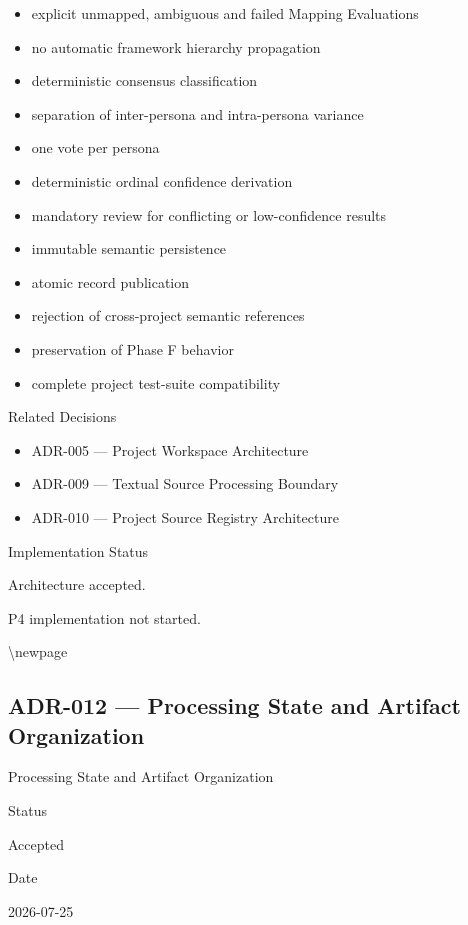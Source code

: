 \begin{itemize}
\item
  explicit unmapped, ambiguous and failed Mapping Evaluations
\item
  no automatic framework hierarchy propagation
\item
  deterministic consensus classification
\item
  separation of inter-persona and intra-persona variance
\item
  one vote per persona
\item
  deterministic ordinal confidence derivation
\item
  mandatory review for conflicting or low-confidence results
\item
  immutable semantic persistence
\item
  atomic record publication
\item
  rejection of cross-project semantic references
\item
  preservation of Phase F behavior
\item
  complete project test-suite compatibility
\end{itemize}

Related Decisions

\begin{itemize}
\tightlist
\item
  ADR-005 --- Project Workspace Architecture
\item
  ADR-009 --- Textual Source Processing Boundary
\item
  ADR-010 --- Project Source Registry Architecture
\end{itemize}

Implementation Status

Architecture accepted.

P4 implementation not started.

\textbackslash newpage

\hypertarget{adr-012--processing-state-and-artifact-organization}{%
\subsection{ADR-012 --- Processing State and Artifact Organization}\label{adr-012--processing-state-and-artifact-organization}}

Processing State and Artifact Organization

Status

Accepted

Date

2026-07-25

